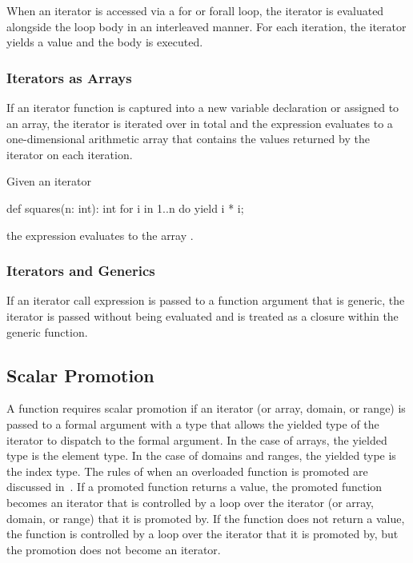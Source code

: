 When an iterator is accessed via a for or forall loop, the iterator is
evaluated alongside the loop body in an interleaved manner.  For each
iteration, the iterator yields a value and the body is executed.

\subsubsection{Iterators as Arrays}
\label{Iterators_as_Arrays}

If an iterator function is captured into a new variable declaration or
assigned to an array, the iterator is iterated over in total and the
expression evaluates to a one-dimensional arithmetic array that
contains the values returned by the iterator on each iteration.
\begin{example}
Given an iterator
\begin{chapel}
def squares(n: int): int {
  for i in 1..n do
    yield i * i;
}
\end{chapel}
the expression  evaluates to the array .
\end{example}

\subsubsection{Iterators and Generics}
\label{Iterators_and_Generics}

If an iterator call expression is passed to a function argument that
is generic, the iterator is passed without being evaluated and is
treated as a closure within the generic function.

\subsection{Scalar Promotion}
\label{Scalar_Promotion}

A function requires scalar promotion if an iterator (or array, domain,
or range) is passed to a formal argument with a type that allows the
yielded type of the iterator to dispatch to the formal argument.  In
the case of arrays, the yielded type is the element type.  In the case
of domains and ranges, the yielded type is the index type.  The rules
of when an overloaded function is promoted are discussed
in~.  If a promoted function returns a
value, the promoted function becomes an iterator that is controlled by
a loop over the iterator (or array, domain, or range) that it is
promoted by.  If the function does not return a value, the function is
controlled by a loop over the iterator that it is promoted by, but the
promotion does not become an iterator.

